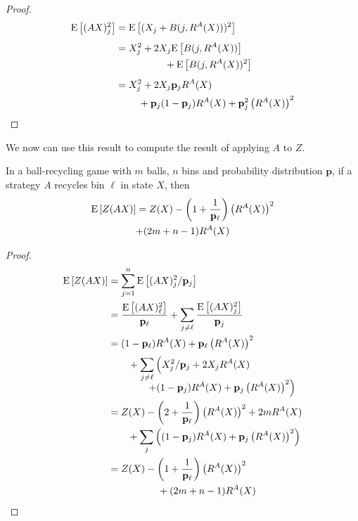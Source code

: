 \begin{proof}
	\begin{align*}
		\E{(AX)_j^2} &= \E{(X_j+B(j,R^A(X)))^2} \\[1ex]
					 &= \begin{multlined}[t] X_j^2 + 2X_j\E{B(j,R^A(X))}\\
						 +\E{B(j,R^A(X))^2} \end{multlined} \\[1ex]
					 &= \begin{multlined}[t] X_j^2 + 2X_j\p_jR^A(X)\\+\p_j(1-\p_j)R^A(X)
						 + \p_j^2\left(R^A(X)\right)^2 \end{multlined}
	\end{align*}
\end{proof}

We now can use this result to compute the result of applying $A$ to $Z$. 
\begin{lemma}
	In a ball-recycling game with $m$ balls, $n$ bins and probability
	distribution $\mathbf{p}$, if a strategy $A$ recycles bin $\ell$ in state
	$X$, then
	\begin{multline}
		\mathrm{E}\left[Z(AX)\right]=Z(X) - \left(1+\frac{1}{\mathbf{p}_\ell}\right)\left(R^A(X)\right)^2 \\
		+ (2m+n-1)R^A(X)
	\end{multline}
\end{lemma}

\begin{proof}
	\begin{align*}
		\E{Z(AX)} 
		&= \sum_{j=1}^n \E{(AX)_j^2/\p_j} \\
		&= \frac{\E{(AX)_\ell^2}}{\p_\ell} + \sum_{j \neq \ell} \frac{\E{(AX)_j^2}}{\p_j} \\
		&= \begin{multlined}[t][6.25cm](1-\p_\ell)R^A(X) + \p_\ell\left(R^A(X)\right)^2 \\[0.75ex]
			\vspace*{-1.5ex}\shoveleft[0.25cm]{+ \sum_{j \neq \ell} \left( X_j^2/\p_j + 2X_jR^A(X)} \vphantom{\left(R^A(X)\right)^2}\right.\\
			\left.+ (1-\p_j)R^A(X) + \p_j\left(R^A(X)\right)^2 \right) \end{multlined} \\
		&= Z(X) - \left(2 + \frac{1}{\p_\ell}\right)\left(R^A(X)\right)^2 + 2mR^A(X) \\
		&\qquad+ \sum_j \left((1-\p_j)R^A(X) + \p_j\left(R^A(X)\right)^2\right) \\
		&= \begin{multlined}[t]Z(X) - \left(1+\frac{1}{\p_\ell}\right)\left(R^A(X)\right)^2 \\
			+ (2m+n-1)R^A(X) \end{multlined}
	\end{align*}
\end{proof}

